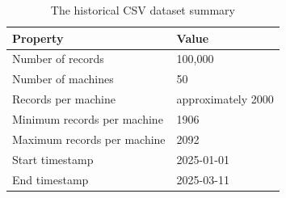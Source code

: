 \begin{table}[htbp]
\centering
\caption{The historical CSV dataset summary}
\label{table:dataset_summary}
\begin{tabularx}{\textwidth}{lX}
\hline
Property & Value \\
\hline
Number of records & 100,000 \\
Number of machines & 50 \\
Records per machine & approximately 2000 \\
Minimum records per machine & 1906 \\
Maximum records per machine & 2092 \\
Start timestamp & 2025-01-01 \\
End timestamp & 2025-03-11 \\
\hline
\end{tabularx}
\end{table}
